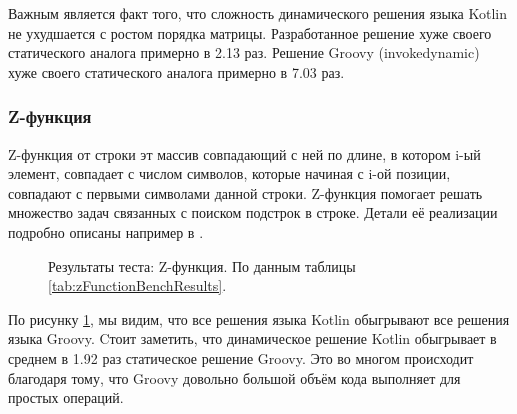 Важным является факт того, что сложность динамического решения языка Kotlin не ухудшается с ростом порядка матрицы. Разработанное решение хуже своего статического аналога примерно в 2.13 раз. Решение Groovy (invokedynamic) хуже своего статического аналога примерно в 7.03 раз.

\subsubsection{Z-функция}


Z-функция от строки эт массив совпадающий с ней по длине, в котором i-ый элемент, совпадает с числом символов, которые начиная с i-ой позиции, совпадают с первыми символами данной строки. Z-функция помогает решать множество задач связанных с поиском подстрок в строке.
Детали её реализации подробно описаны например в \cite{algo:gusfield1997algorithms}.


\begin{figure}
\caption{\label{graph:zFunctionBenchResults}Результаты теста: Z-функция. По данным таблицы \ref{tab:zFunctionBenchResults}.}
\end{figure}

По рисунку \ref{graph:zFunctionBenchResults}, мы видим, что все решения языка Kotlin обыгрывают все решения языка Groovy. Cтоит заметить, что динамическое решение Kotlin обыгрывает в среднем в 1.92 раз статическое решение Groovy. Это во многом происходит благодаря тому, что Groovy довольно большой объём кода выполняет для простых операций.

